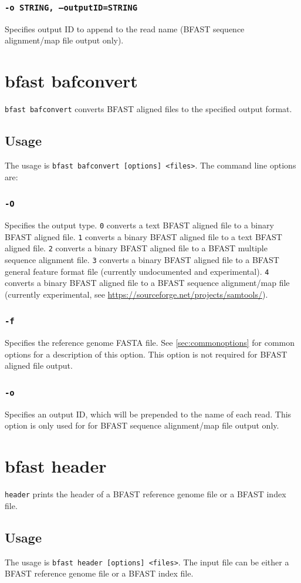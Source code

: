 \documentclass[a4paper,12pt]{book}
\newcommand{\TT}[1]{{\tt #1}} %
\newcommand{\rGFF}{reference genome FASTA file}
\newcommand{\BRGF}{BFAST reference genome file} %
\newcommand{\BIF}{BFAST index file} %
\newcommand{\BAF}{BFAST aligned file} %
\newcommand{\BMAF}{BFAST multiple sequence alignment file} %
\newcommand{\BGFFF}{BFAST general feature format file} %
\newcommand{\BSAMF}{BFAST sequence alignment/map file} %
\begin{document}
\subsubsection{\TT{-o STRING, --outputID=STRING}}
Specifies output ID to append to the read name (\BSAMF{} output only).
\section{bfast bafconvert}
\label{sec:bafconvert}
\TT{bfast bafconvert} converts \BAF{s} to the specified output format.
\subsection{Usage}
The usage is \TT{bfast bafconvert [options] <files>}.
The command line options are:
\subsubsection{\TT{-O}}
Specifies the output type.
\TT{0} converts a text \BAF{} to a binary \BAF{}.
\TT{1} converts a binary \BAF{} to a text \BAF{}.
\TT{2} converts a binary \BAF{} to a \BMAF{}.
\TT{3} converts a binary \BAF{} to a \BGFFF{} (currently undocumented and experimental).
\TT{4} converts a binary \BAF{} to a \BSAMF{} (currently experimental, see \url{https://sourceforge.net/projects/samtools/}).
\subsubsection{\TT{-f}}
Specifies the \rGFF{}.
See \autoref{sec:commonoptions} for common options for a description of this option.
This option is not required for \BAF{} output.
\subsubsection{\TT{-o}}
Specifies an output ID, which will be prepended to the name of each read.
This option is only used for for \BSAMF{} output only.

\section{bfast header}
\label{sec:header}
\TT{header} prints the header of a \BRGF{} or a \BIF{}.
\subsection{Usage}
The usage is \TT{bfast header [options] <files>}.
The input file can be either a \BRGF{} or a \BIF{}.
\end{document}
